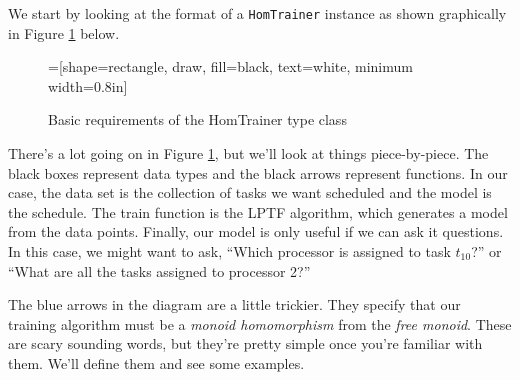 \documentclass[tikz]{tmr}
\newcommand\h{\lstinline}
\newcommand\+{\mdoubleplus}
\begin{document}
We start by looking at the format of a \h{HomTrainer} instance as shown graphically in Figure \ref{fig:HomTrainer} below.

\begin{figure}[H]
\caption{Basic requirements of the HomTrainer type class}
\label{fig:HomTrainer}
\centering
{}=[shape=rectangle, draw, fill=black, text=white, minimum width=0.8in]
\vspace{0.15in}
\end{figure}

There's a lot going on in Figure \ref{fig:HomTrainer}, but we'll look at things piece-by-piece.
The black boxes represent data types and the black arrows represent functions.
In our case, the data set is the collection of tasks we want scheduled and the model is the schedule.
The train function is the LPTF algorithm, which generates a model from the data points.
Finally, our model is only useful if we can ask it questions.
In this case, we might want to ask, ``Which processor is assigned to task $t_{10}$?'' or ``What are all the tasks assigned to processor 2?''

The blue arrows in the diagram are a little trickier.
They specify that our training algorithm must be a \emph{monoid homomorphism} from the \emph{free monoid}.
These are scary sounding words, but they're pretty simple once you're familiar with them.
We'll define them and see some examples.
\end{document}
